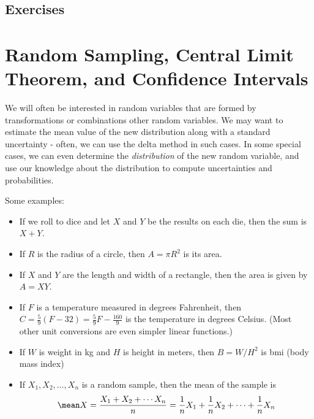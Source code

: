 \documentclass[twoside]{book}\usepackage[]{graphicx}\usepackage[]{xcolor}
\def\Chapter#1{%
\chapter{#1}
}
\newcounter{example}[section]
\newif\ifsolutions
\newif\ifsolutionslocal
\begin{document}
\newpage
\section*{Exercises}
\shipoutProblems

\ifsolutions
\ifsolutionslocal
\newpage
\section*{Solutions}
\shipoutSolutions
\fi
\fi





\Chapter{Random Sampling, Central Limit Theorem, and Confidence Intervals}

We will often be interested in random variables that are formed by transformations
or combinations other random variables.  We may want to estimate the mean value of the new distribution along with a standard uncertainty - often, we can use the delta method in such cases.   In some special cases, we can even determine the \emph{distribution} of the new random variable, and use our knowledge about the distribution to compute uncertainties and probabilities.

Some examples:
\begin{itemize}
	\item
		If we roll to dice and let $X$ and $Y$ be the results on each die,
		then the sum is $X+Y$.
	\item
		If $R$ is the radius of a circle, then $A = \pi R^2$ is its area.
	\item
		If $X$ and $Y$ are the length and width of a rectangle, then
		the area is given by $A = X Y$.
	\item
		If $F$ is a temperature measured in degrees Fahrenheit, then 
		$C = \frac{5}{9}(F-32) = \frac59 F - \frac{160}{9}$ is the 
		temperature in degrees Celsius. (Most other unit conversions
		are even simpler linear functions.)
	\item
		If $W$ is weight in kg and $H$ is height in meters, then
		$B = W/H^2$ is bmi (body mass index)

	\item
		If $X_1, X_2, \dots, X_n$ is a random sample, then the mean of the sample
		is 
		\[
		\mean X = \frac{X_1 + X_2 + \cdots X_n}{n}
		=
		\frac1n X_1 +
		\frac1n X_2 + \cdots +
		\frac1n X_n 
		\]
	\end{itemize}
\end{document}
